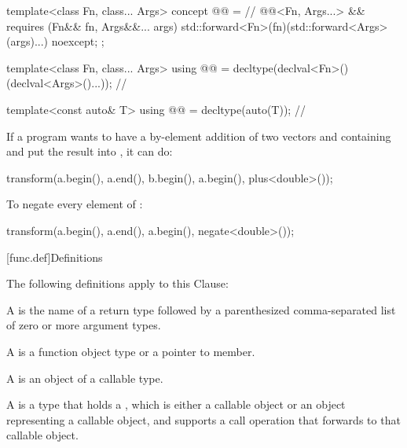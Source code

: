 \begin{codeblock}
{  template<class Fn, class... Args>
    concept @@ =                                          // \expos
      @@<Fn, Args...> &&
      requires (Fn&& fn, Args&&... args) {
        { std::forward<Fn>(fn)(std::forward<Args>(args)...) } noexcept;
      };

  template<class Fn, class... Args>
    using @@ = decltype(declval<Fn>()(declval<Args>()...));  // \expos

  template<const auto& T>
    using @@ = decltype(auto(T));                           // \expos
}
\end{codeblock}

\pnum
\begin{example}
If a \Cpp{} program wants to have a by-element addition of two vectors 
and  containing  and put the result into ,
it can do:

\begin{codeblock}
transform(a.begin(), a.end(), b.begin(), a.begin(), plus<double>());
\end{codeblock}
\end{example}

\pnum
\begin{example}
To negate every element of :

\begin{codeblock}
transform(a.begin(), a.end(), a.begin(), negate<double>());
\end{codeblock}

\end{example}

[func.def]{Definitions}

\pnum
The following definitions apply to this Clause:

\pnum
A  is the name of a return type followed by a
parenthesized comma-separated list of zero or more argument types.

\pnum
A  is a function object type or a pointer to member.

\pnum
A  is an object of a callable type.

\pnum
A  is a type that holds
a ,
which is either
a callable object or
an object representing a callable object,
and supports a call operation that forwards to that callable object.

